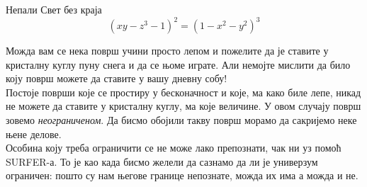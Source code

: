 \begin{surferPage}{Непали}
Свет без краја\\

\smallskip
\[(x y - z^3 -1)^2= (1 - x^2	- y^2)^3\]

\singlespacing
Можда вам се нека површ учини просто лепом и пожелите да је ставите у кристалну куглу пуну снега и да се њоме играте. Али немојте мислити да било коју површ можете да ставите у вашу дневну собу!
\\
\singlespacing
Постоје површи које се простиру у бесконачност и које, ма како биле лепе, никад не можете да ставите у кристалну куглу, ма које величине. У овом случају површ зовемо \textit{неограниченом}. Да бисмо обојили такву површ морамо да сакријемо неке њене делове.
\\
\singlespacing
Особина коју треба ограничити се не може лако препознати, чак ни уз помоћ SURFER-а. То је као када бисмо желели да сазнамо да ли је универзум ограничен: пошто су нам његове границе непознате, можда их има а можда и не.
\end{surferPage}
